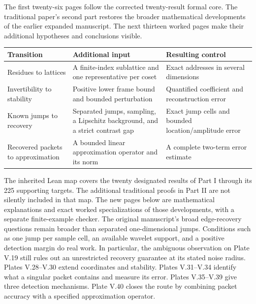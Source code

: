 The first twenty-six pages follow the corrected twenty-result formal core. The traditional paper's second part restores the broader mathematical developments of the earlier expanded manuscript. The next thirteen worked pages make their additional hypotheses and conclusions visible.
\begin{tabularx}{\linewidth}{@{}>{\raggedright\arraybackslash}p{.21\linewidth}YY@{}}\toprule
Transition & Additional input & Resulting control\\\midrule
Residues to lattices & A finite-index sublattice and one representative per coset & Exact addresses in several dimensions\\
Invertibility to stability & Positive lower frame bound and bounded perturbation & Quantified coefficient and reconstruction error\\
Known jumps to recovery & Separated jumps, sampling, a Lipschitz background, and a strict contrast gap & Exact jump cells and bounded location/amplitude error\\
Recovered packets to approximation & A bounded linear approximation operator and its norm & A complete two-term error estimate\\\bottomrule
\end{tabularx}
The inherited Lean map covers the twenty designated results of Part I through its 225 supporting targets. The additional traditional proofs in Part II are not silently included in that map. The new pages below are mathematical explanations and exact worked specializations of those developments, with a separate finite-example checker.
The original manuscript's broad edge-recovery questions remain broader than separated one-dimensional jumps. Conditions such as one jump per sample cell, an available wavelet support, and a positive detection margin do real work. In particular, the ambiguous observation on Plate V.19 still rules out an unrestricted recovery guarantee at its stated noise radius.
Plates V.28--V.30 extend coordinates and stability. Plates V.31--V.34 identify what a singular packet contains and measure its error. Plates V.35--V.39 give three detection mechanisms. Plate V.40 closes the route by combining packet accuracy with a specified approximation operator.

